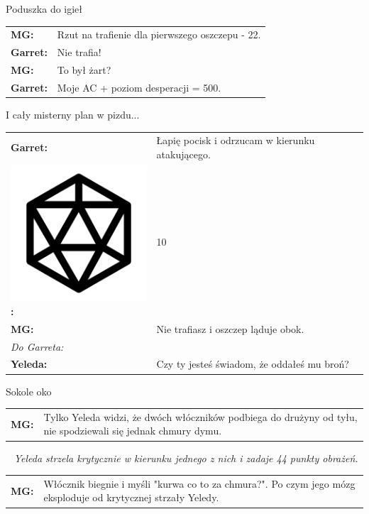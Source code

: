 \documentclass[10pt,twoside,twocolumn]{book}
\begin{document}
\begin{rpg-quotebox}{Poduszka do igieł}
   \begin{tabularx}{\columnwidth}{lX}
      \textbf{MG:} & Rzut na trafienie dla pierwszego oszczepu - 22.\\
      \textbf{Garret:} & Nie trafia!\\
      \textbf{MG:} & To był żart?\\
      \textbf{Garret:} & Moje AC + poziom desperacji = 500.\\
   \end{tabularx}
\end{rpg-quotebox}

\begin{rpg-quotebox}{I cały misterny plan w pizdu...}
   \begin{tabularx}{\columnwidth}{lX}
      \textbf{Garret:} & Łapię pocisk i odrzucam w kierunku atakującego.\\
      \includegraphics[scale=0.06]{img/d20.png}\textbf{:}& 10\\
      \textbf{MG:} & Nie trafiasz i oszczep ląduje obok.\\
      \multicolumn{2}{l}{\textit{Do Garreta:}}\\
      \textbf{Yeleda:} & Czy ty jesteś świadom, że oddałeś mu broń?\\
   \end{tabularx}
\end{rpg-quotebox}

\begin{rpg-quotebox}{Sokole oko}
   \begin{tabularx}{\columnwidth}{lX}
      \textbf{MG:} & Tylko Yeleda widzi, że dwóch włóczników podbiega do drużyny od tyłu, nie spodziewali się jednak chmury dymu.\\
   \end{tabularx}
   ~\newline
   \textit{Yeleda strzela krytycznie w kierunku jednego z nich i zadaje 44 punkty obrażeń.}\\

   \begin{tabularx}{\columnwidth}{lX}
      \textbf{MG:} & Włócznik biegnie i myśli "kurwa co to za chmura?". Po czym jego mózg eksploduje od krytycznej strzały Yeledy.\\
   \end{tabularx}
\end{rpg-quotebox}
\end{document}
